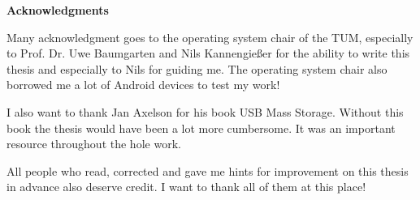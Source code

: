 \clearemptydoublepage
{}
{}	



\vspace*{2cm}

\begin{center}
{\Large \bf Acknowledgments}
\end{center}

\vspace{1cm}

Many acknowledgment goes to the operating system chair of the TUM, especially to Prof. Dr. Uwe Baumgarten and Nils Kannengie{\ss}er for the ability to write this thesis and especially to Nils for guiding me. The operating system chair also borrowed me a lot of Android devices to test my work!

I also want to thank Jan Axelson for his book USB Mass Storage\cite{usb_ms_jan}. Without this book the thesis would have been a lot more cumbersome. It was an important resource throughout the hole work.

All people who read, corrected and gave me hints for improvement on this thesis in advance also deserve credit. I want to thank all of them at this place!